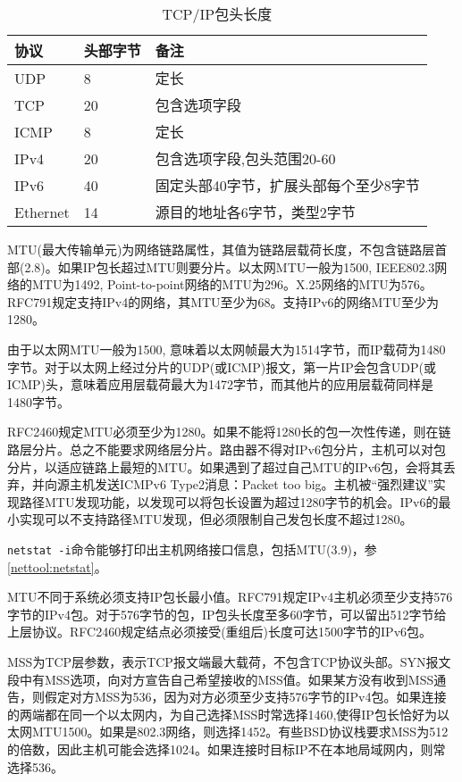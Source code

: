 \begin{table}[ht]
\begin{center}
\begin{tabular}{|l|l|l|}
\hline
协议 & 头部字节 & 备注 \\
\hline
UDP & 8 &   定长 \\
\hline
TCP & 20 & 包含选项字段 \\
\hline
ICMP & 8 & 定长 \\
\hline
IPv4 & 20 & 包含选项字段,包头范围20-60 \\
\hline
IPv6 & 40 & 固定头部40字节，扩展头部每个至少8字节 \\
\hline
Ethernet & 14 & 源目的地址各6字节，类型2字节\\
\hline
\end{tabular}
\caption{TCP/IP包头长度}
\end{center}


\end{table}

MTU(最大传输单元)为网络链路属性，其值为链路层载荷长度，不包含链路层首部(\cite{tcpipill}2.8)。如果IP包长超过MTU则要分片。以太网MTU一般为1500, IEEE802.3网络的MTU为1492, Point-to-point网络的MTU为296。X.25网络的MTU为576。RFC791规定支持IPv4的网络，其MTU至少为68。支持IPv6的网络MTU至少为1280。

由于以太网MTU一般为1500, 意味着以太网帧最大为1514字节，而IP载荷为1480字节。对于以太网上经过分片的UDP(或ICMP)报文，第一片IP会包含UDP(或ICMP)头，意味着应用层载荷最大为1472字节，而其他片的应用层载荷同样是1480字节。

RFC2460规定MTU必须至少为1280。如果不能将1280长的包一次性传递，则在链路层分片。总之不能要求网络层分片。路由器不得对IPv6包分片，主机可以对包分片，以适应链路上最短的MTU。如果遇到了超过自己MTU的IPv6包，会将其丢弃，并向源主机发送ICMPv6 Type2消息：Packet too big。主机被“强烈建议”实现路径MTU发现功能，以发现可以将包长设置为超过1280字节的机会。IPv6的最小实现可以不支持路径MTU发现，但必须限制自己发包长度不超过1280。


\verb+netstat -i+命令能够打印出主机网络接口信息，包括MTU(\cite{tcpipill}3.9)，参\ref{nettool:netstat}。

MTU不同于系统必须支持IP包长最小值。RFC791规定IPv4主机必须至少支持576字节的IPv4包。对于576字节的包，IP包头长度至多60字节，可以留出512字节给上层协议。RFC2460规定结点必须接受(重组后)长度可达1500字节的IPv6包。

MSS为TCP层参数，表示TCP报文端最大载荷，不包含TCP协议头部。SYN报文段中有MSS选项，向对方宣告自己希望接收的MSS值。如果某方没有收到MSS通告，则假定对方MSS为536，因为对方必须至少支持576字节的IPv4包。如果连接的两端都在同一个以太网内，为自己选择MSS时常选择1460,使得IP包长恰好为以太网MTU1500。如果是802.3网络，则选择1452。有些BSD协议栈要求MSS为512的倍数，因此主机可能会选择1024。如果连接时目标IP不在本地局域网内，则常选择536。

